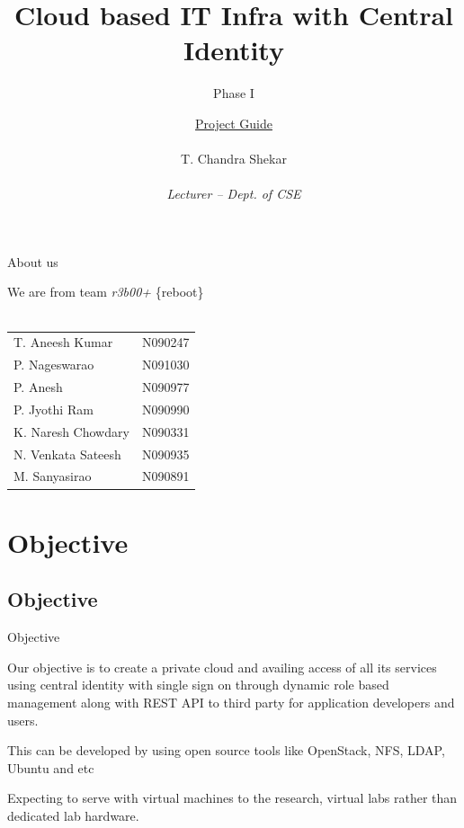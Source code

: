 \documentclass[10pt,xcolor=dvipsnames]{beamer}
\title[Cloud based IT Infra with Central Identity]{Cloud based IT Infra with Central Identity}
\subtitle{Phase I}
\author{ \underline{Project Guide} \\ \hspace{2mm} \\ \small{ T. Chandra Shekar } \tiny \\ \underline{} \\ \scriptsize \textit{Lecturer -- Dept. of CSE} }
\institute{ \underline{Presenting by} \\ \hspace{2mm} \\ \textit {Team r3b00+ }  \\ \hspace{4mm} \\ Dept. of CSE, RGUKT -- Nuzvid}
\begin{document}
\begin{frame}
\titlepage
\end{frame}


\begin{frame}{About us}

\small
\begin{center}
We are from team \textit{r3b00+}  \{reboot\} \\ \hspace{4cm} \\
\begin{tabular}{l  l }
T. Aneesh Kumar & N090247   \\
P. Nageswarao  & N091030  \\
P. Anesh  & N090977 \\
P. Jyothi Ram & N090990 \\
K. Naresh Chowdary  & N090331 \\
N. Venkata Sateesh  & N090935 \\
M. Sanyasirao & N090891  
\end{tabular}


\end{center}


\end{frame}
 

\section{Objective}
\subsection{Objective}
\begin{frame}{Objective}

Our objective is to create a  private cloud and availing access of all its services using central identity with single sign on through dynamic role based management along with REST API to third party for application developers and users. \newline

This can be developed by using open source tools like OpenStack, NFS, LDAP, Ubuntu and etc \newline

Expecting to serve with virtual machines to the research, virtual labs rather than dedicated lab hardware.
\end{frame}
\end{document}
